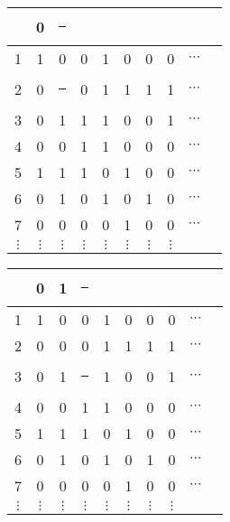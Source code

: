 \documentclass[compress,17pt]{beamer}
\newcommand\hl{\bgroup\markoverwith
    {\textcolor{yellow}{\rule[-.5ex]{.1pt}{2.5ex}}}\ULon}
\begin{document}
\begin{frame}
  \centering
  \begin{tabular}{ | c | c c c c c c c c c }
    \hline
    &  0 & \hl 1 \\
    \hline

    1 & 1 & 0 & 0 & 1 & 0 & 0 & 0 & $\cdots$\\
    2 & 0 & \hl 0 & 0 & 1 & 1 & 1 & 1 & $\cdots$\\
    3 & 0 & 1 & 1 & 1 & 0 & 0 & 1 & $\cdots$\\
    4 & 0 & 0 & 1 & 1 & 0 & 0 & 0 & $\cdots$\\
    5 & 1 & 1 & 1 & 0 & 1 & 0 & 0 & $\cdots$\\
    6 & 0 & 1 & 0 & 1 & 0 & 1 & 0 & $\cdots$\\
    7 & 0 & 0 & 0 & 0 & 1 & 0 & 0 & $\cdots$\\
    $\vdots$ & $\vdots$ & $\vdots$ & $\vdots$ & $\vdots$ & $\vdots$ & $\vdots$ & $\vdots$ & \\
  \end{tabular}
\end{frame}

\begin{frame}
  \centering
  \begin{tabular}{ | c | c c c c c c c c c }
    \hline
    &  0 & 1 & \hl 0 \\
    \hline

    1 & 1 & 0 & 0 & 1 & 0 & 0 & 0 & $\cdots$\\
    2 & 0 & 0 & 0 & 1 & 1 & 1 & 1 & $\cdots$\\
    3 & 0 & 1 & \hl 1 & 1 & 0 & 0 & 1 & $\cdots$\\
    4 & 0 & 0 & 1 & 1 & 0 & 0 & 0 & $\cdots$\\
    5 & 1 & 1 & 1 & 0 & 1 & 0 & 0 & $\cdots$\\
    6 & 0 & 1 & 0 & 1 & 0 & 1 & 0 & $\cdots$\\
    7 & 0 & 0 & 0 & 0 & 1 & 0 & 0 & $\cdots$\\
    $\vdots$ & $\vdots$ & $\vdots$ & $\vdots$ & $\vdots$ & $\vdots$ & $\vdots$ & $\vdots$ & \\
  \end{tabular}
\end{frame}
\end{document}
